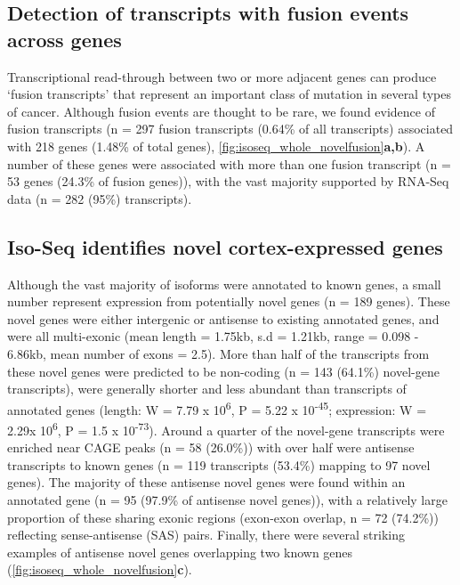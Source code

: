 \begin{figure}[htp]
	\label{fig:isoseq_whole_rnaseqvsisoseq}
\end{figure}

\subsection{Detection of transcripts with fusion events across genes}
Transcriptional read-through between two or more adjacent genes can produce ‘fusion transcripts’ that represent an important class of mutation in several types of cancer\cite{McCartney2019}. Although fusion events are thought to be rare\cite{Akiva2006a}, we found evidence of fusion transcripts (n = 297 fusion transcripts (0.64\% of all transcripts) associated with 218 genes (1.48\% of total genes), \cref{fig:isoseq_whole_novelfusion}\textbf{a,b}). A number of these genes were associated with more than one fusion transcript (n = 53 genes (24.3\% of fusion genes)), with the vast majority supported by RNA-Seq data (n = 282 (95\%) transcripts). 

\subsection{Iso-Seq identifies novel cortex-expressed genes}
\label{sec:whole_novelgenes}
Although the vast majority of isoforms were annotated to known genes, a small number represent expression from potentially novel genes (n = 189 genes).  These novel genes were either intergenic or antisense to existing annotated genes, and were all multi-exonic (mean length = 1.75kb, s.d = 1.21kb, range = 0.098 - 6.86kb, mean number of exons = 2.5). More than half of the transcripts from these novel genes were predicted to be non-coding (n = 143 (64.1\%) novel-gene transcripts), were generally shorter and less abundant than transcripts of annotated genes (length: W = 7.79 x 10\textsuperscript{6}, P = 5.22 x 10\textsuperscript{-45}; expression: W = 2.29x 10\textsuperscript{6}, P = 1.5 x 10\textsuperscript{-73}). Around a quarter of the novel-gene transcripts were enriched near CAGE peaks (n = 58 (26.0\%)) with over half were antisense transcripts to known genes (n = 119 transcripts (53.4\%) mapping to 97 novel genes). The majority of these antisense novel genes were found within an annotated gene (n = 95 (97.9\% of antisense novel genes)), with a relatively large proportion of these sharing exonic regions (exon-exon overlap, n = 72 (74.2\%)) reflecting sense-antisense (SAS) pairs. Finally, there were several striking examples of antisense novel genes overlapping two known genes (\cref{fig:isoseq_whole_novelfusion}\textbf{c}). 


